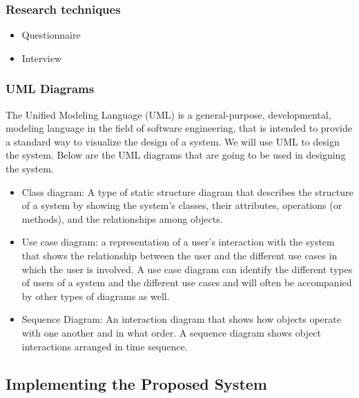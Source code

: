 \documentclass[12pt]{article}
\begin{document}
		\subsubsection{Research techniques}
			\begin{itemize}
				\item Questionnaire
				\item Interview
			\end{itemize}
		\subsubsection{UML Diagrams}
		The Unified Modeling Language (UML) is a general-purpose, developmental, modeling language in the field of software engineering, that is intended to provide a standard way to visualize the design of a system. We will use UML to design the system. Below are the UML diagrams that are going to be used in designing the system.
			\begin{itemize}
				\item Class diagram: A type of static structure diagram that describes the structure of a system by showing the system's classes, their attributes, operations (or methods), and the relationships among objects.
				\item Use case diagram: a representation of a user's interaction with the system that shows the relationship between the user and the different use cases in which the user is involved. A use case diagram can identify the different types of users of a system and the different use cases and will often be accompanied by other types of diagrams as well.
				\item Sequence Diagram: An interaction diagram that shows how objects operate with one another and in what order. A sequence diagram shows object interactions arranged in time sequence.
			\end{itemize}
	
	
	\subsection{Implementing the Proposed System}
\end{document}
